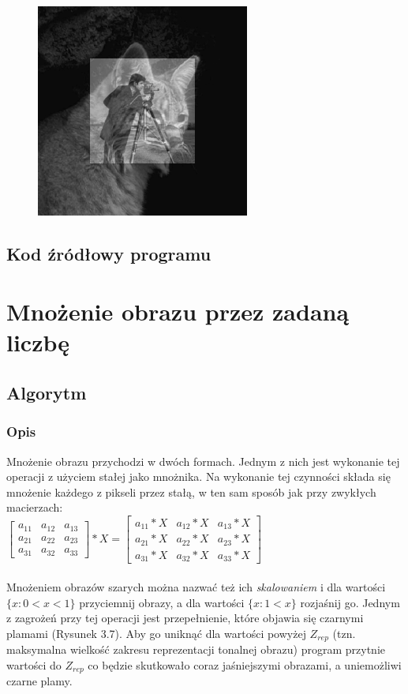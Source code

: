 \documentclass[a4paper,12pt]{book}
\begin{document}
\begin{figure}[H]
	\includegraphics[width=7cm, height=7cm]{2/sum-gray-images-2-norm.png}
\end{figure}

\subsection*{Kod źródłowy programu}

\section{Mnożenie obrazu przez zadaną liczbę}
\subsection*{Algorytm}
\subsubsection*{Opis}
Mnożenie obrazu przychodzi w dwóch formach. Jednym z nich jest wykonanie tej operacji z użyciem stałej jako mnożnika. Na wykonanie tej czynności składa się mnożenie każdego z pikseli przez stałą, w ten sam sposób jak przy zwykłych macierzach: \\
$
\begin{bmatrix}
a_{11} & a_{12} & a_{13}\\
a_{21} & a_{22} & a_{23}\\
a_{31} & a_{32} & a_{33}
\end{bmatrix}
* X = 
\begin{bmatrix}
a_{11} * X & a_{12} * X & a_{13} * X\\
a_{21} * X & a_{22} * X & a_{23} * X\\
a_{31} * X & a_{32} * X & a_{33} * X
\end{bmatrix}
$
\\\\
Mnożeniem obrazów szarych można nazwać też ich \textit{skalowaniem} i dla wartości $\{x: 0 < x < 1\}$ przyciemnij obrazy, a dla wartości $\{x: 1 < x\}$ rozjaśnij go. 
Jednym z zagrożeń przy tej operacji jest przepełnienie, które objawia się czarnymi plamami (Rysunek 3.7). Aby go uniknąć dla wartości powyżej  $Z_{rep}$ (tzn. maksymalna wielkość zakresu reprezentacji tonalnej obrazu) program przytnie wartości do $Z_{rep}$ co będzie skutkowało coraz jaśniejszymi obrazami, a uniemożliwi czarne plamy. 
\end{document}
